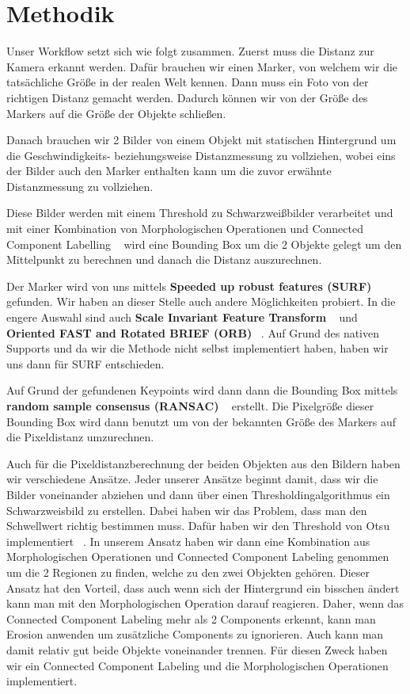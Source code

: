 \documentclass[deutsch]{scrartcl}
\begin{document}

\section{Methodik}

Unser Workflow setzt sich wie folgt zusammen. Zuerst muss die Distanz zur Kamera erkannt werden. Dafür brauchen wir einen Marker, von welchem wir die tatsächliche Größe in der realen Welt kennen. Dann muss ein Foto von der richtigen Distanz gemacht werden. Dadurch können wir von der Größe des Markers auf die Größe der Objekte schließen. 

Danach brauchen wir 2 Bilder von einem Objekt mit statischen Hintergrund um die Geschwindigkeits- beziehungsweise Distanzmessung zu vollziehen, wobei eins der Bilder auch den Marker enthalten kann um die zuvor erwähnte Distanzmessung zu vollziehen.

Diese Bilder werden mit einem Threshold zu Schwarzweißbilder verarbeitet und mit einer Kombination von Morphologischen Operationen und Connected Component Labelling ~\cite{suzuki2003linear} wird eine Bounding Box um die 2 Objekte gelegt um den Mittelpunkt zu berechnen und danach die Distanz auszurechnen.

Der Marker wird von uns mittels \textbf{Speeded up robust features (SURF)} ~\cite{bay2006surf} gefunden. Wir haben an dieser Stelle auch andere Möglichkeiten probiert. In die engere Auswahl sind auch \textbf{Scale Invariant Feature Transform} ~\cite{lowe2004distinctive} und \textbf{Oriented FAST and Rotated BRIEF (ORB)} ~\cite{rublee2011orb}. Auf Grund des nativen Supports und da wir die Methode nicht selbst implementiert haben, haben wir uns dann für SURF entschieden. 

Auf Grund der gefundenen Keypoints wird dann dann die Bounding Box mittels \textbf{random sample consensus (RANSAC)} ~\cite{fischler1981random} erstellt. Die Pixelgröße dieser Bounding Box wird dann benutzt um von der bekannten Größe des Markers auf die Pixeldistanz umzurechnen.

Auch für die Pixeldistanzberechnung der beiden Objekten aus den Bildern haben wir verschiedene Ansätze. Jeder unserer Ansätze beginnt damit, dass wir die Bilder voneinander abziehen und dann über einen Thresholdingalgorithmus ein Schwarzweisbild zu erstellen. Dabei haben wir das Problem, dass man den Schwellwert richtig bestimmen muss. Dafür haben wir den Threshold von Otsu implementiert ~\cite{otsu1975threshold}. In unserem Ansatz haben wir dann eine Kombination aus Morphologischen Operationen und Connected Component Labeling genommen um die 2 Regionen zu finden, welche zu den zwei Objekten gehören. Dieser Ansatz hat den Vorteil, dass auch wenn sich der Hintergrund ein bisschen ändert kann man mit den Morphologischen Operation darauf reagieren. Daher, wenn das Connected Component Labeling mehr als 2 Components erkennt, kann man Erosion anwenden um zusätzliche Components zu ignorieren. Auch kann man damit relativ gut beide Objekte voneinander trennen. Für diesen Zweck haben wir ein Connected Component Labeling und die Morphologischen Operationen implementiert.
\end{document}
